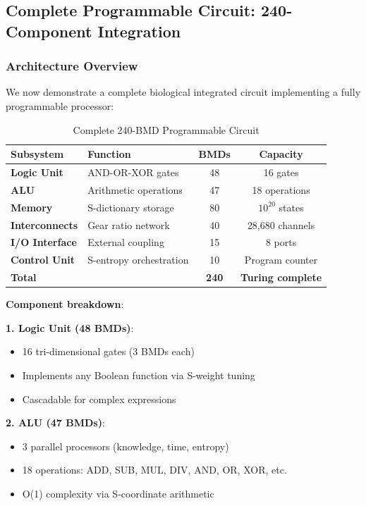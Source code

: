 \documentclass[11pt,a4paper]{article}
\begin{document}
\subsection{Complete Programmable Circuit: 240-Component Integration}

\subsubsection{Architecture Overview}

We now demonstrate a complete biological integrated circuit implementing a fully programmable processor:

\begin{table}[H]
\centering
\caption{Complete 240-BMD Programmable Circuit}
\begin{tabular}{llcc}
\toprule
\textbf{Subsystem} & \textbf{Function} & \textbf{BMDs} & \textbf{Capacity} \\
\midrule
\textbf{Logic Unit} & AND-OR-XOR gates & 48 & 16 gates \\
\textbf{ALU} & Arithmetic operations & 47 & 18 operations \\
\textbf{Memory} & S-dictionary storage & 80 & $10^{20}$ states \\
\textbf{Interconnects} & Gear ratio network & 40 & 28,680 channels \\
\textbf{I/O Interface} & External coupling & 15 & 8 ports \\
\textbf{Control Unit} & S-entropy orchestration & 10 & Program counter \\
\midrule
\textbf{Total} & & \textbf{240} & \textbf{Turing complete} \\
\bottomrule
\end{tabular}
\end{table}

\textbf{Component breakdown}:

\textbf{1. Logic Unit (48 BMDs)}:
\begin{itemize}
\item 16 tri-dimensional gates (3 BMDs each)
\item Implements any Boolean function via S-weight tuning
\item Cascadable for complex expressions
\end{itemize}

\textbf{2. ALU (47 BMDs)}:
\begin{itemize}
\item 3 parallel processors (knowledge, time, entropy)
\item 18 operations: ADD, SUB, MUL, DIV, AND, OR, XOR, etc.
\item O(1) complexity via S-coordinate arithmetic
\end{itemize}
\end{document}
